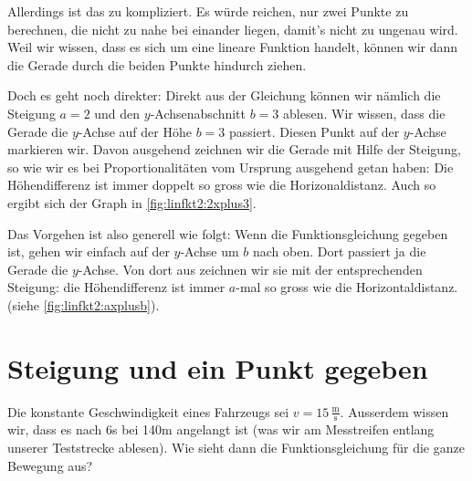 \documentclass[%
11pt,%
twoside,%
titlepage,%
german,%
headsepline%
]{scrartcl}
\newcommand{\ufrac}[2]{\ensuremath{\,\frac{\mathrm{#1}}{\mathrm{#2}}}}
\begin{document}
{Allerdings ist das zu kompliziert. Es w\"urde reichen, nur zwei Punkte zu berechnen, die nicht zu nahe bei einander liegen, damit's nicht zu ungenau wird. Weil wir wissen, dass es sich um eine lineare Funktion handelt, k\"onnen wir dann die Gerade durch die beiden Punkte hindurch ziehen.

Doch es geht noch direkter: Direkt aus der Gleichung k\"onnen wir n\"amlich die Steigung $a=2$ und den $y$-Achsenabschnitt $b=3$ ablesen. Wir wissen, dass die Gerade die $y$-Achse auf der H\"ohe $b=3$ passiert. Diesen Punkt auf der $y$-Achse markieren wir. Davon ausgehend zeichnen wir die Gerade mit Hilfe der Steigung, so wie wir es bei Proportionalit\"aten vom Ursprung ausgehend getan haben: Die H\"ohendifferenz ist immer doppelt so gross wie die Horizonaldistanz. Auch so ergibt sich der Graph in \ref{fig:linfkt2:2xplus3}.

Das Vorgehen ist also generell wie folgt: Wenn die Funktionsgleichung gegeben ist, gehen wir einfach auf der $y$-Achse um $b$ nach oben. Dort passiert ja die Gerade die $y$-Achse. Von dort aus zeichnen wir sie mit der entsprechenden Steigung: die H\"ohendifferenz ist immer $a$-mal so gross wie die Horizontaldistanz. (siehe \ref{fig:linfkt2:axplusb}).


\section{Steigung und ein Punkt gegeben}
\label{linfkt2:a+pktgeg}

Die konstante Geschwindigkeit eines Fahrzeugs sei $v=15\ufrac{m}{s}$. Ausserdem wissen wir, dass es nach 6\unit{s} bei 140\unit{m} angelangt ist (was wir am Messtreifen entlang unserer Teststrecke ablesen). Wie sieht dann die Funktionsgleichung f\"ur die ganze Bewegung aus?

}
\end{document}
